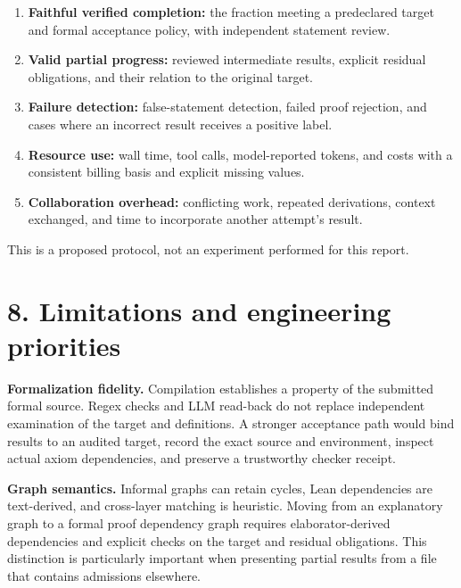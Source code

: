 \documentclass[11pt,a4paper]{article}
\begin{document}
\begin{enumerate}

\item \textbf{Faithful verified completion:} the fraction meeting a predeclared target and formal acceptance policy, with independent statement review.

\item \textbf{Valid partial progress:} reviewed intermediate results, explicit residual obligations, and their relation to the original target.

\item \textbf{Failure detection:} false-statement detection, failed proof rejection, and cases where an incorrect result receives a positive label.

\item \textbf{Resource use:} wall time, tool calls, model-reported tokens, and costs with a consistent billing basis and explicit missing values.

\item \textbf{Collaboration overhead:} conflicting work, repeated derivations, context exchanged, and time to incorporate another attempt's result.

\end{enumerate}

This is a proposed protocol, not an experiment performed for this report.

\section*{8. Limitations and engineering priorities}

\textbf{Formalization fidelity.} Compilation establishes a property of the submitted formal source. Regex checks and LLM read-back do not replace independent examination of the target and definitions. A stronger acceptance path would bind results to an audited target, record the exact source and environment, inspect actual axiom dependencies, and preserve a trustworthy checker receipt.

\textbf{Graph semantics.} Informal graphs can retain cycles, Lean dependencies are text-derived, and cross-layer matching is heuristic. Moving from an explanatory graph to a formal proof dependency graph requires elaborator-derived dependencies and explicit checks on the target and residual obligations. This distinction is particularly important when presenting partial results from a file that contains admissions elsewhere.
\end{document}
